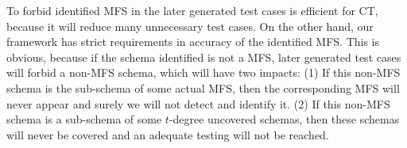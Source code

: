 \documentclass[10pt,journal,compsoc]{IEEEtran}
\begin{document}
%
%




To forbid identified MFS in the later generated test cases is efficient for CT, because it will reduce many unnecessary test cases. On the other hand, our framework has strict requirements in accuracy of the identified MFS. This is obvious, because if the schema identified is not a MFS, later generated test cases will forbid a non-MFS schema, which will have two impacts: (1) If this non-MFS schema is the sub-schema of some actual MFS, then the corresponding MFS will never appear and surely we will not detect and identify it. (2) If this non-MFS schema is a sub-schema of some $t$-degree uncovered schemas, then these schemas will never be covered and an adequate testing will not be reached.
\end{document}
